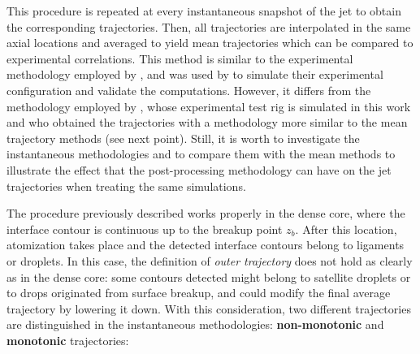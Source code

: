 This procedure is repeated at every instantaneous snapshot of the jet to obtain the corresponding trajectories. Then, all  trajectories are interpolated in the same axial locations and averaged to yield mean trajectories which can be compared to experimental correlations. This method is similar to the experimental methodology employed by , and was used by  to simulate their experimental configuration and validate the computations. However, it differs from the methodology employed by , whose experimental test rig is simulated in this work and who obtained the trajectories with a methodology more similar to the mean trajectory methods (see next point). Still, it is worth to investigate the instantaneous methodologies and to compare them with the mean methods to illustrate the effect that the post-processing methodology can have on the jet trajectories when treating the same simulations.

The procedure previously described works properly in the dense core, where the interface contour is continuous up to the breakup point $z_b$. After this location, atomization takes place and the detected interface contours belong to ligaments or droplets. In this case, the definition of \textsl{outer trajectory} does not hold as clearly as in the dense core: some contours detected might belong to satellite droplets or to drops originated from surface breakup, and could modify the final average trajectory by lowering it down. With this consideration, two different trajectories are distinguished in the instantaneous methodologies: \textbf{non-monotonic} and \textbf{monotonic} trajectories:


